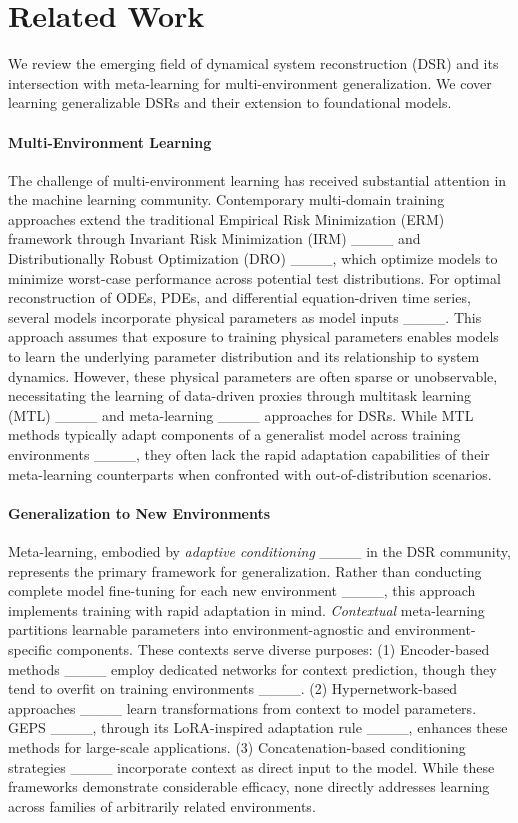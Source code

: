 \section{Related Work}
\label{relatedwork}

We review the emerging field of dynamical system reconstruction (DSR) and its intersection with meta-learning for multi-environment generalization. We cover learning generalizable DSRs and their extension to foundational models.

\paragraph{Multi-Environment Learning} The challenge of multi-environment learning has received substantial attention in the machine learning community. Contemporary multi-domain training approaches extend the traditional Empirical Risk Minimization (ERM) framework through Invariant Risk Minimization (IRM) ____ and Distributionally Robust Optimization (DRO) ____, which optimize models to minimize worst-case performance across potential test distributions. For optimal reconstruction of ODEs, PDEs, and differential equation-driven time series, several models incorporate physical parameters as model inputs ____. This approach assumes that exposure to training physical parameters enables models to learn the underlying parameter distribution and its relationship to system dynamics. However, these physical parameters are often sparse or unobservable, necessitating the learning of data-driven proxies through multitask learning (MTL) ____ and meta-learning ____ approaches for DSRs. While MTL methods typically adapt components of a generalist model across training environments ____, they often lack the rapid adaptation capabilities of their meta-learning counterparts when confronted with out-of-distribution scenarios.

\paragraph{Generalization to New Environments} Meta-learning, embodied by \emph{adaptive conditioning} ____ in the DSR community, represents the primary framework for generalization. Rather than conducting complete model fine-tuning for each new environment ____, this approach implements training with rapid adaptation in mind. \emph{Contextual} meta-learning partitions learnable parameters into environment-agnostic and environment-specific components. These contexts serve diverse purposes: (1) Encoder-based methods ____ employ dedicated networks for context prediction, though they tend to overfit on training environments ____. (2) Hypernetwork-based approaches ____ learn transformations from context to model parameters. GEPS ____, through its LoRA-inspired adaptation rule ____, enhances these methods for large-scale applications. (3) Concatenation-based conditioning strategies ____ incorporate context as direct input to the model. While these frameworks demonstrate considerable efficacy, none directly addresses learning across families of arbitrarily related environments.

